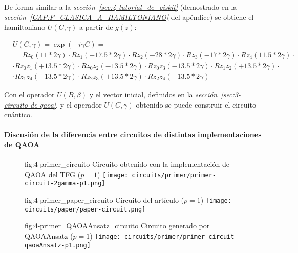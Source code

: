 De forma similar a la \textit{sección~\ref{sec:4-tutorial_de_qiskit}} (demostrado en la \textit{sección~\ref{CAP:F_CLASICA_A_HAMILTONIANO}} del apéndice) se obtiene el hamiltoniano $U(C, \gamma)$ a partir de $g(z)$:

\begin{align}
  &U(C, \gamma) = \exp(-i \gamma C) = \nonumber \\
  &= Rz_0(11*2\gamma) \cdot Rz_1(-17.5*2\gamma) \cdot Rz_2(-28*2\gamma) \cdot Rz_3(-17*2\gamma) \cdot Rz_4(11.5*2\gamma) \cdot \nonumber \\
  & \cdot Rz_0z_1(+13.5 * 2\gamma) \cdot Rz_0z_2(-13.5 * 2\gamma) \cdot Rz_0z_3(-13.5 * 2\gamma) \cdot Rz_1z_2(+13.5 * 2\gamma) \cdot \nonumber \\
  & \cdot Rz_1z_4(-13.5 * 2\gamma) \cdot Rz_2z_3(+13.5 * 2\gamma) \cdot Rz_2z_4(-13.5 * 2\gamma)
\end{align}

Con el operador \(U(B, \beta)\) y el vector inicial, definidos en la \textit{sección~\ref{sec:3-circuito de qaoa}}, y el operador \(U(C, \gamma)\) obtenido se puede construir el circuito cuántico.

\paragraph{Discusión de la diferencia entre circuitos de distintas implementaciones de QAOA\label{sec:4-primer_grafo_diferencias_con_el_articulo}}

\begin{figure}[Circuito {--} shortest path de Urgelles \textit{et al.} (2022) propio]{fig:4-primer_circuito}{ Circuito obtenido con la implementación de QAOA del TFG ($p=1$) }
  \centering
  \texttt{[image: circuits/primer/primer-circuit-2gamma-p1.png]}
\end{figure}

\begin{figure}[Circuito {--} shortest path de Urgelles \textit{et al.} (2022) de la fuente]{fig:4-primer_paper_circuito}{ Circuito del artículo\cite{multi-objective_routing_optimization} ($p=1$) }
  \centering
  \texttt{[image: circuits/paper/paper-circuit.png]}
\end{figure}

\begin{figure}[Circuito {--} shortest path de Urgelles \textit{et al.} (2022) de QAOAAnsatz]{fig:4-primer_QAOAAnsatz_circuito}{ Circuito generado por QAOAAnsatz ($p=1$) }
  \centering
  \texttt{[image: circuits/primer/primer-circuit-qaoaAnsatz-p1.png]}
\end{figure}

